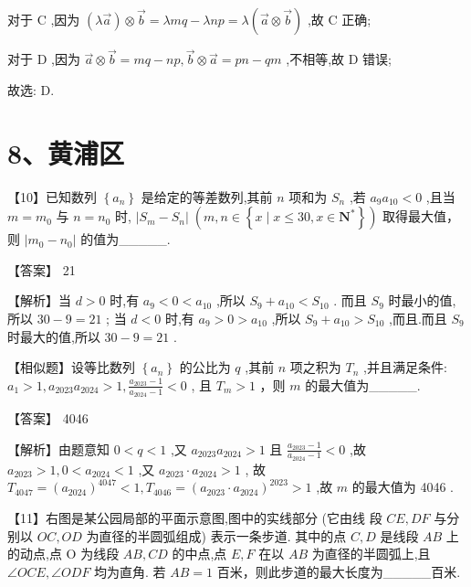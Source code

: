 \documentclass[10pt]{article}
\begin{document}
对于 \(\mathrm{C}\) ,因为 \(\left( {\lambda \overrightarrow{a}}\right)  \otimes  \overrightarrow{b} = {\lambda mq} - {\lambda np} = \lambda \left( {\overrightarrow{a} \otimes  \overrightarrow{b}}\right)\) ,故 \(\mathrm{C}\) 正确;

对于 \(\mathrm{D}\) ,因为 \(\overrightarrow{a} \otimes  \overrightarrow{b} = {mq} - {np},\overrightarrow{b} \otimes  \overrightarrow{a} = {pn} - {qm}\) ,不相等,故 \(\mathrm{D}\) 错误;

故选: D.

\section*{8、黄浦区}

【10】已知数列 \(\left\{  {a}_{n}\right\}\) 是给定的等差数列,其前 \(n\) 项和为 \({S}_{n}\) ,若 \({a}_{9}{a}_{10} < 0\) ,且当 \(m = {m}_{0}\) 与 \(n = {n}_{0}\) 时, \(\left| {{S}_{m} - {S}_{n}}\right| \; \left( {m,n \in  \left\{  {x \mid  x \leq  {30},x \in  {\mathbf{N}}^{ * }}\right\}  }\right)\) 取得最大值，则 \(\left| {{m}_{0} - {n}_{0}}\right|\) 的值为\_\_\_\_\_.

【答案】 21

【解析】当 \(d > 0\) 时,有 \({a}_{9} < 0 < {a}_{10}\) ,所以 \({S}_{9} + {a}_{10} < {S}_{10}\) . 而且 \({S}_{9}\) 时最小的值,所以 \({30} - 9 = {21}\) ; 当 \(d < 0\) 时,有 \({a}_{9} > 0 > {a}_{10}\) ,所以 \({S}_{9} + {a}_{10} > {S}_{10}\) ,而且.而且 \({S}_{9}\) 时最大的值,所以 \({30} - 9 = {21}\) .

【相似题】设等比数列 \(\left\{  {a}_{n}\right\}\) 的公比为 \(q\) ,其前 \(n\) 项之积为 \({T}_{n}\) ,并且满足条件: \({a}_{1} > 1,{a}_{2023}{a}_{2024} > 1,\frac{{a}_{2023} - 1}{{a}_{2024} - 1} < 0\) , 且 \({T}_{m} > 1\) ，则 \(m\) 的最大值为\_\_\_\_\_.

【答案】 4046

【解析】由题意知 \(0 < q < 1\) ,又 \({a}_{2023}{a}_{2024} > 1\) 且 \(\frac{{a}_{2023} - 1}{{a}_{2024} - 1} < 0\) ,故 \({a}_{2023} > 1,0 < {a}_{2024} < 1\) ,又 \({a}_{2023} \cdot  {a}_{2024} > 1\) , 故 \({T}_{4047} = {\left( {a}_{2024}\right) }^{4047} < 1,{T}_{4046} = {\left( {a}_{2023} \cdot  {a}_{2024}\right) }^{2023} > 1\) ,故 \(m\) 的最大值为 4046 .

【11】右图是某公园局部的平面示意图,图中的实线部分 (它由线 段 \({CE},{DF}\) 与分别以 \({OC},{OD}\) 为直径的半圆弧组成) 表示一条步道. 其中的点 \(C,D\) 是线段 \({AB}\) 上的动点,点 \(\mathrm{O}\) 为线段 \({AB},{CD}\) 的中点,点 \(E,F\) 在以 \({AB}\) 为直径的半圆弧上,且 \(\angle {OCE},\angle {ODF}\) 均为直角. 若 \({AB} = 1\) 百米，则此步道的最大长度为\_\_\_\_\_百米.
\end{document}
